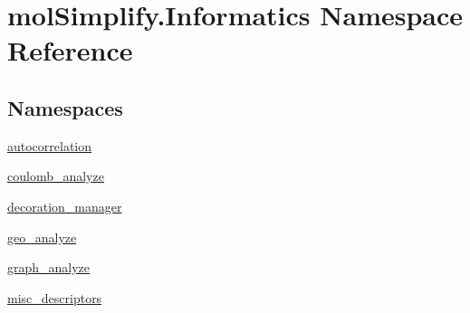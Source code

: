 \hypertarget{namespacemolSimplify_1_1Informatics}{}\section{mol\+Simplify.\+Informatics Namespace Reference}
\label{namespacemolSimplify_1_1Informatics}
\subsection*{Namespaces}
\begin{DoxyCompactItemize}
\item 
 \hyperlink{namespacemolSimplify_1_1Informatics_1_1autocorrelation}{autocorrelation}
\item 
 \hyperlink{namespacemolSimplify_1_1Informatics_1_1coulomb__analyze}{coulomb\+\_\+analyze}
\item 
 \hyperlink{namespacemolSimplify_1_1Informatics_1_1decoration__manager}{decoration\+\_\+manager}
\item 
 \hyperlink{namespacemolSimplify_1_1Informatics_1_1geo__analyze}{geo\+\_\+analyze}
\item 
 \hyperlink{namespacemolSimplify_1_1Informatics_1_1graph__analyze}{graph\+\_\+analyze}
\item 
 \hyperlink{namespacemolSimplify_1_1Informatics_1_1misc__descriptors}{misc\+\_\+descriptors}
\end{DoxyCompactItemize}
